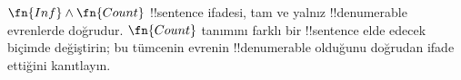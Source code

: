 \begin{prob}
$\fn{Inf} \land \fn{Count}$ !!{sentence} ifadesi, tam ve yalnız
!!{denumerable} evrenlerde doğrudur. $\fn{Count}$ tanımını farklı bir
!!{sentence} elde edecek biçimde değiştirin; bu tümcenin evrenin
!!{denumerable} olduğunu doğrudan ifade ettiğini kanıtlayın.
\end{prob}


